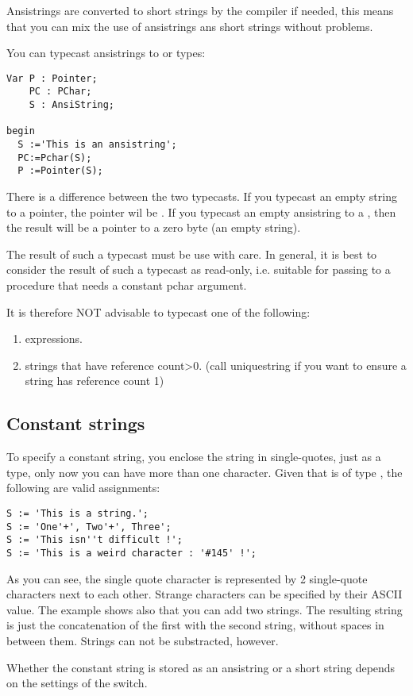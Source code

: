 \documentclass{report}
\begin{document}
Ansistrings are converted to short strings by the compiler if needed,
this means that you can mix the use of ansistrings ans short strings
without problems.

You can typecast ansistrings to  or  types:
\begin{verbatim}
Var P : Pointer;
    PC : PChar;
    S : AnsiString;

begin
  S :='This is an ansistring';
  PC:=Pchar(S);
  P :=Pointer(S);
\end{verbatim}
There is a difference between the two typecasts. If you typecast an empty
string to a pointer, the pointer wil be . If you typecast an empty
ansistring to a , then the result will be a pointer to a zero
byte (an empty string).

The result of such a typecast must be use with care. In general, it is best
to consider the result of such a typecast as read-only, i.e. suitable for
passing to a procedure that needs a constant pchar argument.

It is therefore NOT advisable to typecast one of the following:
\begin{enumerate}
\item expressions.
\item strings that have reference count>0.  (call uniquestring if you want to
ensure a string has reference count 1)
\end{enumerate}
\subsection{Constant strings}

To specify a constant string, you enclose the string in single-quotes, just
as a  type, only now you can have more than one character.
Given that  is of type , the following are valid assignments:
\begin{verbatim}
S := 'This is a string.';
S := 'One'+', Two'+', Three';
S := 'This isn''t difficult !';
S := 'This is a weird character : '#145' !';
\end{verbatim}
As you can see, the single quote character is represented by 2 single-quote
characters next to each other. Strange characters can be specified by their
ASCII value.
The example shows also that you can add two strings. The resulting string is
just the concatenation of the first with the second string, without spaces in
between them. Strings can not be substracted, however.

Whether the constant string is stored as an ansistring or a short string
depends on the settings of the  switch.
\end{document}
